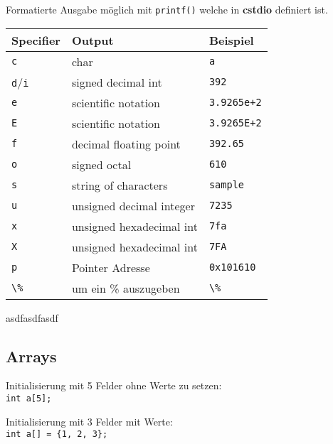 \documentclass{article}
\begin{document}
\begin{multicols*}{3}
						Formatierte Ausgabe möglich mit \lstinline!printf()! welche in \textbf{cstdio} definiert ist.

						\begin{tabular}{l|l|l}
										\hline
										Specifier & Output & Beispiel\\
										\hline
										\lstinline!c!               & char                     & \lstinline!a! \\
										\lstinline!d!/\lstinline!i! & signed decimal int       & \lstinline!392! \\
										\lstinline!e!               & scientific notation      & \lstinline!3.9265e+2! \\
										\lstinline!E!               & scientific notation      & \lstinline!3.9265E+2! \\
										\lstinline!f!               & decimal floating point   & \lstinline!392.65! \\
										\lstinline!o!               & signed octal             & \lstinline!610! \\
										\lstinline!s!               & string of characters     & \lstinline!sample! \\
										\lstinline!u!               & unsigned decimal integer & \lstinline!7235! \\
										\lstinline!x!               & unsigned hexadecimal int & \lstinline!7fa! \\
										\lstinline!X!               & unsigned hexadecimal int & \lstinline!7FA! \\
										\lstinline!p!               & Pointer Adresse          & \lstinline!0x101610! \\
										\lstinline!\%!              & um ein \% auszugeben     & \lstinline!\%! \\
										\hline
									\end{tabular}

						asdfasdfasdf

		\subsection{Arrays} %
			Initialisierung mit 5 Felder ohne Werte zu setzen: \\
			\lstinline!int a[5];!
			
			Initialisierung mit 3 Felder mit Werte: \\
			\lstinline!int a[] = {1, 2, 3};!
			

\end{multicols*}
\end{document}

